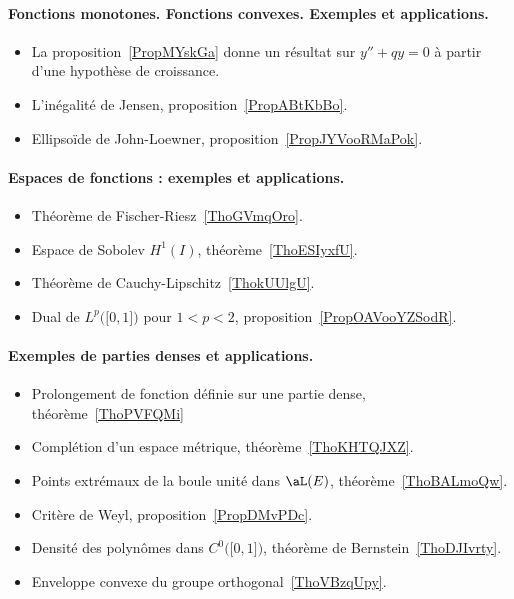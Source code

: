 \paragraph{Fonctions monotones. Fonctions convexes. Exemples et applications.}
\begin{itemize}
    \item La proposition~\ref{PropMYskGa} donne un résultat sur \( y''+qy=0\) à partir d'une hypothèse de croissance.
    \item L'inégalité de Jensen, proposition~\ref{PropABtKbBo}.
    \item Ellipsoïde de John-Loewner, proposition~\ref{PropJYVooRMaPok}.
\end{itemize}
\paragraph{Espaces de fonctions : exemples et applications.}
\begin{itemize}
    \item Théorème de Fischer-Riesz~\ref{ThoGVmqOro}.
    \item Espace de Sobolev \( H^1(I)\), théorème~\ref{ThoESIyxfU}.
    \item Théorème de Cauchy-Lipschitz~\ref{ThokUUlgU}.
    \item Dual de \( L^p\big( \mathopen[ 0 , 1 \mathclose] \big)\) pour \( 1<p<2\), proposition~\ref{PropOAVooYZSodR}.
\end{itemize}
\paragraph{Exemples de parties denses et applications.}
\begin{itemize}
    \item Prolongement de fonction définie sur une partie dense, théorème~\ref{ThoPVFQMi}
    \item Complétion d'un espace métrique, théorème~\ref{ThoKHTQJXZ}.
    \item Points extrémaux de la boule unité dans \( \aL(E)\), théorème~\ref{ThoBALmoQw}.
    \item Critère de Weyl, proposition~\ref{PropDMvPDc}.
    \item Densité des polynômes dans \( C^0\big( \mathopen[ 0 , 1 \mathclose] \big)\), théorème de Bernstein~\ref{ThoDJIvrty}.
    \item Enveloppe convexe du groupe orthogonal~\ref{ThoVBzqUpy}.
\end{itemize}
